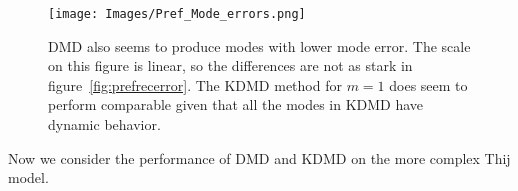 \begin{figure}
    \texttt{[image: Images/Pref\_Mode\_errors.png]}
    \centering
    \caption{DMD also seems to produce modes with lower mode error. The scale on this figure is linear,
    so the differences are not as stark in figure~\ref{fig:prefrecerror}. The KDMD method for $m=1$
    does seem to perform comparable given that all the modes in KDMD have dynamic behavior.}
\end{figure} 






\FloatBarrier

Now we consider the performance of DMD and KDMD on the more complex Thij model.

